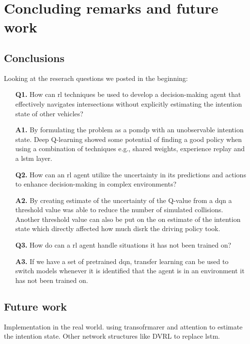 \chapter{Concluding remarks and future work}
\section{Conclusions}\label{sec:conclusion}
Looking at the reserach questions we posted in the beginning: 
\begin{enumerate}
	\item[\textbf{Q1.}] How can \gls{rl} techniques be used to develop a decision-making agent that effectively navigates intersections without explicitly estimating the intention state of other vehicles? 
	\item[\textbf{A1.}]By formulating the problem as a \gls{pomdp} with an unobservable intention state. Deep Q-learning showed some potential of finding a good policy when using a combination of techniques e.g., shared weights, experience replay and a \gls{lstm} layer.
	\item[\textbf{Q2.}] How can an \gls{rl} agent utilize the uncertainty in its predictions and actions to enhance decision-making in complex environments? 
	\item[\textbf{A2.}] By creating estimate of the uncertainty of the Q-value from a \gls{dqn} a threshold value was able to reduce the number of simulated collisions. Another threshold value can also be put on the on estimate of the intention state which directly affected how much disrk the driving policy took. 
	\item[\textbf{Q3.}] How do can a \gls{rl} agent handle situations it has not been trained on? 
	\item[\textbf{A3.}] If we have a set of pretrained \gls{dqn}, transfer learning can be used to switch models whenever it is identified that the agent is in an environment it has not been trained on.
\end{enumerate}



\section{Future work}
Implementation in the real world. 
using transofrmarer and attention to estimate the intention state. 
Other network structures like DVRL to replace lstm.